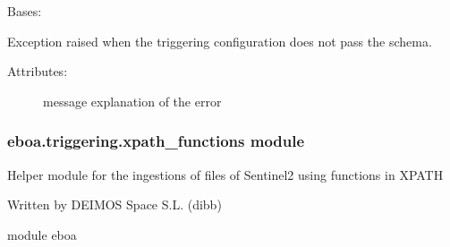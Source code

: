 
\begin{fulllineitems}
\label{\detokenize{eboa.triggering:eboa.triggering.errors.TriggeringConfigDoesNotPassSchema}}
Bases: {\hyperref[\detokenize{eboa.triggering:eboa.triggering.errors.Error}]{}}

Exception raised when the triggering configuration does not pass the schema.
\begin{description}
\item[{Attributes:}] \leavevmode
message \textendash{} explanation of the error

\end{description}

\end{fulllineitems}



\subsubsection{eboa.triggering.xpath\_functions module}
\label{\detokenize{eboa.triggering:module-eboa.triggering.xpath_functions}}\label{\detokenize{eboa.triggering:eboa-triggering-xpath-functions-module}}
Helper module for the ingestions of files of Sentinel\sphinxhyphen{}2 using functions in XPATH

Written by DEIMOS Space S.L. (dibb)

module eboa

